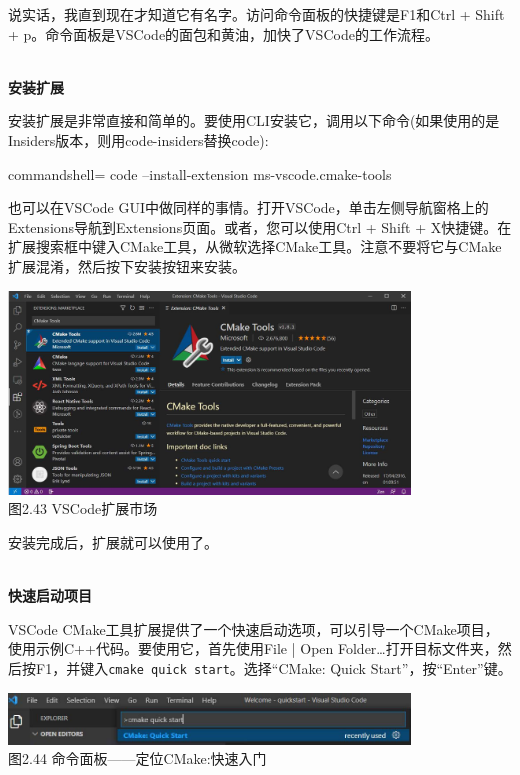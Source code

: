 说实话，我直到现在才知道它有名字。访问命令面板的快捷键是F1和Ctrl + Shift + p。命令面板是VSCode的面包和黄油，加快了VSCode的工作流程。

\hspace*{\fill} \\ %
\noindent
\textbf{安装扩展}

安装扩展是非常直接和简单的。要使用CLI安装它，调用以下命令(如果使用的是Insiders版本，则用code-insiders替换code):

\begin{tcblisting}{commandshell={}}
code --install-extension ms-vscode.cmake-tools
\end{tcblisting}

也可以在VSCode GUI中做同样的事情。打开VSCode，单击左侧导航窗格上的Extensions导航到Extensions页面。或者，您可以使用Ctrl + Shift + X快捷键。在扩展搜索框中键入CMake工具，从微软选择CMake工具。注意不要将它与CMake扩展混淆，然后按下安装按钮来安装。

\begin{center}
\includegraphics[width=0.8\textwidth]{content/1/chapter2/images/43.jpg}\\
图2.43  VSCode扩展市场
\end{center}

安装完成后，扩展就可以使用了。

\hspace*{\fill} \\ %
\noindent
\textbf{快速启动项目}

VSCode CMake工具扩展提供了一个快速启动选项，可以引导一个CMake项目，使用示例C++代码。要使用它，首先使用File | Open Folder…打开目标文件夹，然后按F1，并键入\texttt{cmake quick start}。选择“CMake: Quick Start”，按“Enter”键。

\begin{center}
\includegraphics[width=0.8\textwidth]{content/1/chapter2/images/44.jpg}\\
图2.44 命令面板——定位CMake:快速入门
\end{center}

